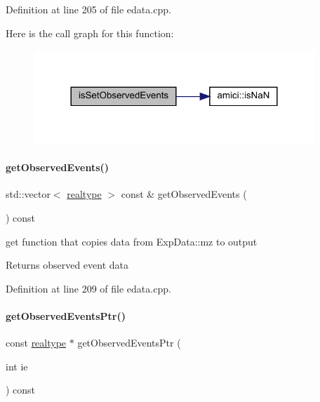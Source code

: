 Definition at line 205 of file edata.\+cpp.

Here is the call graph for this function\+:
\nopagebreak
\begin{figure}[H]
\begin{center}
\leavevmode
\includegraphics[width=300pt]{classamici_1_1_exp_data_a7270ea1362212e4dc344e24dc01b70ee_cgraph}
\end{center}
\end{figure}
\mbox{\label{classamici_1_1_exp_data_a4f70119553de7d120b14600d7a6d5267}} 
\paragraph{\texorpdfstring{get\+Observed\+Events()}{getObservedEvents()}}
{\footnotesize\ttfamily std\+::vector$<$ \mbox{\hyperlink{namespaceamici_a1bdce28051d6a53868f7ccbf5f2c14a3}{realtype}} $>$ const  \& get\+Observed\+Events (\begin{DoxyParamCaption}{ }\end{DoxyParamCaption}) const}

get function that copies data from Exp\+Data\+::mz to output

\begin{DoxyReturn}{Returns}
observed event data 
\end{DoxyReturn}


Definition at line 209 of file edata.\+cpp.

\mbox{\label{classamici_1_1_exp_data_a95ab3fe91af62612f202fdc6cd033d2a}} 
\paragraph{\texorpdfstring{get\+Observed\+Events\+Ptr()}{getObservedEventsPtr()}}
{\footnotesize\ttfamily const \mbox{\hyperlink{namespaceamici_a1bdce28051d6a53868f7ccbf5f2c14a3}{realtype}} $\ast$ get\+Observed\+Events\+Ptr (\begin{DoxyParamCaption}\item[{int}]{ie }\end{DoxyParamCaption}) const}

